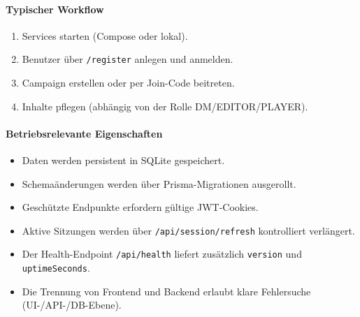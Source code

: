 \paragraph{Typischer Workflow}
\begin{enumerate}
  \item Services starten (Compose oder lokal).
  \item Benutzer über \texttt{/register} anlegen und anmelden.
  \item Campaign erstellen oder per Join-Code beitreten.
  \item Inhalte pflegen (abhängig von der Rolle DM/EDITOR/PLAYER).
\end{enumerate}

\paragraph{Betriebsrelevante Eigenschaften}
\begin{itemize}
  \item Daten werden persistent in SQLite gespeichert.
  \item Schemaänderungen werden über Prisma-Migrationen ausgerollt.
  \item Geschützte Endpunkte erfordern gültige JWT-Cookies.
  \item Aktive Sitzungen werden über \texttt{/api/session/refresh} kontrolliert
  verlängert.
  \item Der Health-Endpoint \texttt{/api/health} liefert zusätzlich \texttt{version} und \texttt{uptimeSeconds}.
  \item Die Trennung von Frontend und Backend erlaubt klare Fehlersuche
  (UI-/API-/DB-Ebene).
\end{itemize}
